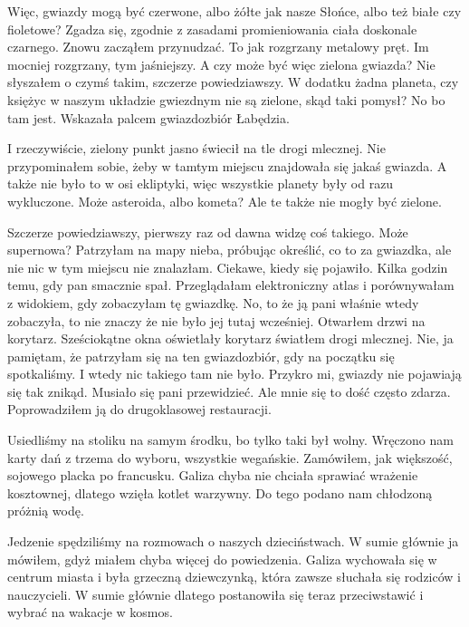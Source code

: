 \begin{dialogue}
	\ds{} Więc, gwiazdy mogą być czerwone, albo żółte jak nasze Słońce, albo też białe czy fioletowe?
	\ds{} Zgadza się, zgodnie z zasadami promieniowania ciała doskonale czarnego. \dm{} Znowu zacząłem przynudzać. \dm{} To jak rozgrzany metalowy pręt.
		Im mocniej rozgrzany, tym jaśniejszy.
	\ds{} A czy może być więc zielona gwiazda?
	\ds{} Nie słyszałem o czymś takim, szczerze powiedziawszy. W dodatku żadna planeta, czy księżyc w naszym układzie gwiezdnym nie są zielone, skąd taki pomysł?
	\ds{} No bo tam jest. \dm{} Wskazała palcem gwiazdozbiór Łabędzia.
\end{dialogue}

I rzeczywiście, zielony punkt jasno świecił na tle drogi mlecznej.
Nie przypominałem sobie, żeby w tamtym miejscu znajdowała się jakaś gwiazda.
A także nie było to w osi ekliptyki, więc wszystkie planety były od razu wykluczone.
Może asteroida, albo kometa?
Ale te także nie mogły być zielone.

\begin{dialogue}
	\ds{} Szczerze powiedziawszy, pierwszy raz od dawna widzę coś takiego. Może supernowa?
	\ds{} Patrzyłam na mapy nieba, próbując określić, co to za gwiazdka, ale nie nic w tym miejscu nie znalazłam.
	\ds{} Ciekawe, kiedy się pojawiło.
	\ds{} Kilka godzin temu, gdy pan smacznie spał. Przeglądałam elektroniczny atlas i porównywałam z widokiem, gdy zobaczyłam tę gwiazdkę.
	\ds{} No, to że ją pani właśnie wtedy zobaczyła, to nie znaczy że nie było jej tutaj wcześniej. \dm{} Otwarłem drzwi na korytarz. Sześciokątne okna oświetlały korytarz światłem drogi mlecznej.
	\ds{} Nie, ja pamiętam, że patrzyłam się na ten gwiazdozbiór, gdy na początku się spotkaliśmy. I wtedy nic takiego tam nie było.
	\ds{} Przykro mi, gwiazdy nie pojawiają się tak znikąd. Musiało się pani przewidzieć. Ale mnie się to dość często zdarza. \dm{} Poprowadziłem ją do drugoklasowej restauracji.
\end{dialogue}

Usiedliśmy na stoliku na samym środku, bo tylko taki był wolny.
Wręczono nam karty dań z trzema do wyboru, wszystkie wegańskie.
Zamówiłem, jak większość, sojowego placka po francusku.
Galiza chyba nie chciała sprawiać wrażenie kosztownej, dlatego wzięła kotlet warzywny.
Do tego podano nam chłodzoną próżnią wodę.

Jedzenie spędziliśmy na rozmowach o naszych dzieciństwach.
W sumie głównie ja mówiłem, gdyż miałem chyba więcej do powiedzenia.
Galiza wychowała się w centrum miasta i była grzeczną dziewczynką, która zawsze słuchała się rodziców i nauczycieli.
W sumie głównie dlatego postanowiła się teraz przeciwstawić i wybrać na wakacje w kosmos.

